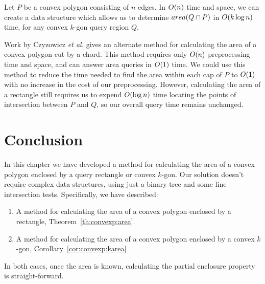 \begin{corollary}
\label{cor:convexp:karea}
Let $P$ be a convex polygon consisting of $n$ edges. In $O\!\left(n\right)$ time and space, we can create a data structure which allows us to determine $area(Q \cap P)$ in $O\!\left(k \log{n}\right)$ time, for any convex $k$-gon query region $Q$.
\end{corollary}

Work by Czyzowicz \textit{et al.}\cite{DBLP:conf/cccg/CzyzowiczCU98} gives an alternate method for calculating the area of a convex polygon cut by a chord.  This method requires only $O\!\left(n\right)$ preprocessing time and space, and can answer area queries in $O\!\left(1\right)$ time. We could use this method to reduce the time needed to find the area within each cap of $P$ to $O\!\left(1\right)$ with no increase in the cost of our preprocessing. However, calculating the area of a rectangle still requires us to expend $O\!\left(\log{n}\right)$ time locating the points of intersection between $P$ and $Q$, so our overall query time remains unchanged.


\section{Conclusion}
\label{:convexp:concl}

In this chapter we have developed a method for calculating the area of a convex polygon enclosed by a query rectangle or convex $k$-gon. 
Our solution doesn't require complex data structures, using just a binary tree and some line intersection tests.
Specifically, we have described:

\begin{enumerate}
\item A method for calculating the area of a convex polygon enclosed by a rectangle, Theorem~\ref{th:convexp:area}.

\item A method for calculating the area of a convex polygon enclosed by a convex $k$-gon, Corollary~\ref{cor:convexp:karea}
\end{enumerate}

In both cases, once the area is known, calculating the partial enclosure property is straight-forward.
